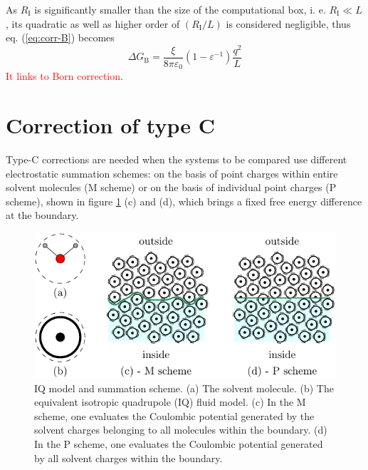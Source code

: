 As $R_{\mathrm{I}}$ is significantly smaller than the size of the
computational box, i. e. $R_{\mathrm{I}}\ll L$, its quadratic as
well as higher order of $\left(R_{\mathrm{I}}/L\right)$ is considered
negligible, thus eq. (\ref{eq:corr-B}) becomes
\begin{equation}
\Delta G_{\mathrm{B}}=\frac{\xi}{8\pi\varepsilon_{0}}\left(1-\varepsilon^{-1}\right)\frac{q^{2}}{L}
\end{equation}
\textcolor{red}{It links to Born correction}.

\section{Correction of type C}

Type-C corrections are needed when the systems to be compared use
different electrostatic summation schemes: on the basis of point charges
within entire solvent molecules (M scheme) or on the basis of individual
point charges (P scheme), shown in figure \ref{fig:IQ-model-som-scheme}
(c) and (d), which brings a fixed free energy difference at the boundary.

\begin{figure}[h]
\begin{centering}
\includegraphics{_figure/ion_correction}
\par\end{centering}
\caption[IQ model and summation scheme]{IQ model and summation scheme. (a) The solvent molecule. (b) The
equivalent isotropic quadrupole (IQ) fluid model. (c) In the M scheme,
one evaluates the Coulombic potential generated by the solvent charges
belonging to all molecules within the boundary. (d) In the P scheme,
one evaluates the Coulombic potential generated by all solvent charges
within the boundary.\label{fig:IQ-model-som-scheme}}
\end{figure}

